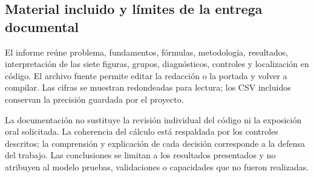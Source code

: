 \documentclass[11pt,a4paper]{article}
\begin{document}
\subsection{Material incluido y límites de la entrega documental}
El informe reúne problema, fundamentos, fórmulas, metodología, resultados, interpretación de las siete figuras, grupos, diagnósticos, controles y localización en código. El archivo fuente permite editar la redacción o la portada y volver a compilar. Las cifras se muestran redondeadas para lectura; los CSV incluidos conservan la precisión guardada por el proyecto.

La documentación no sustituye la revisión individual del código ni la exposición oral solicitada. La coherencia del cálculo está respaldada por los controles descritos; la comprensión y explicación de cada decisión corresponde a la defensa del trabajo. Las conclusiones se limitan a los resultados presentados y no atribuyen al modelo pruebas, validaciones o capacidades que no fueron realizadas.
\end{document}
